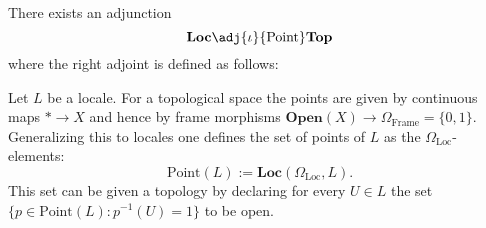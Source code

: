     \begin{construct}
        There exists an adjunction \[\textbf{Loc}\adj{\iota}{\text{Point}}\textbf{Top}\] where the right adjoint is defined as follows:

        \indent Let $L$ be a locale. For a topological space the points are given by continuous maps $\ast\rightarrow X$ and hence by frame morphisms $\textbf{Open}(X)\rightarrow\Omega_{\text{Frame}}=\{0, 1\}$. Generalizing this to locales one defines the set of points of $L$ as the $\Omega_{\text{Loc}}$-elements: \[\text{Point}(L) := \textbf{Loc}(\Omega_{\text{Loc}}, L).\] This set can be given a topology by declaring for every $U\in L$ the set $\{p\in\text{Point}(L) : p^{-1}(U) = 1\}$ to be open.
    \end{construct}